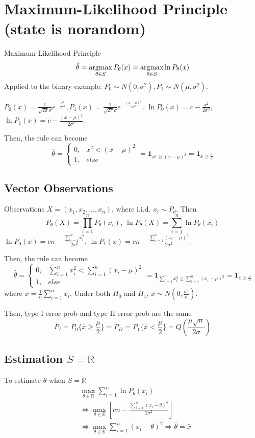 \documentclass[11pt]{elegantbook}
\newcommand{\argmax}{\operatornamewithlimits{argmax}}
\begin{document}
\section{Maximum-Likelihood Principle (state is norandom)}
Maximum-Likelihood Principle $$\hat{\theta}=\argmax_{\theta\in S}P_{\theta}(x)=\argmax_{\theta\in S}\ln P_{\theta}(x)$$
Applied to the binary example: $P_0\sim N(0,\sigma^2), P_1\sim N(\mu,\sigma^2)$.

$P_0(x)=\frac{1}{\sqrt{2\pi}\sigma}e^{-\frac{x^2}{2\sigma^2}}, P_1(x)=\frac{1}{\sqrt{2\pi}\sigma}e^{-\frac{(x-\mu)^2}{2\sigma^2}}$. $\ln P_0(x)=c-\frac{x^2}{2\sigma^2}$, $\ln P_1(x)=c-\frac{(x-\mu)^2}{2\sigma^2}$.

Then, the rule can become $$\hat{\theta}=\left\{\begin{matrix}
    0,&x^2<(x-\mu)^2\\
    1,&else
\end{matrix}\right.=\mathbf{1}_{x^2\geq (x-\mu)^2}=\mathbf{1}_{x\geq \frac{\mu}{2}}$$

\subsection*{Vector Observations}
Observations $X=\left(x_1,x_2,...,x_n\right)$, where i.i.d. $x_i\sim P_\theta$. Then $$P_\theta(X)=\prod_{i=1}^n P_\theta(x_i),\ \ln P_\theta(X)=\sum_{i=1}^n\ln P_\theta(x_i)$$
$\ln P_0(x)=cn-\frac{\sum_{i=1}^n x_i^2}{2\sigma^2}$, $\ln P_1(x)=cn-\frac{\sum_{i=1}^n(x_i-\mu)^2}{2\sigma^2}$.

Then, the rule can become $$\hat{\theta}=\left\{\begin{matrix}
    0,&\sum_{i=1}^nx_i^2<\sum_{i=1}^n(x_i-\mu)^2\\
    1,&else
\end{matrix}\right.=\mathbf{1}_{\sum_{i=1}^nx_i^2\geq \sum_{i=1}^n(x_i-\mu)^2}=\mathbf{1}_{\bar{x}\geq \frac{\mu}{2}}$$
where $\bar{x}=\frac{1}{n}\sum_{i=1}^nx_i$. Under both $H_0$ and $H_1$, $\bar{x}\sim N(0,\frac{\sigma^2}{n})$.

Then, type I error prob and type II error prob are the same $$P_I=P_0\{\bar{x}\geq \frac{\mu}{2}\}=P_{II}=P_1\{\bar{x}< \frac{\mu}{2}\}=Q\left(\frac{\mu\sqrt{n}}{2\sigma}\right)$$

\subsection*{Estimation $S=\mathbb{R}$}
To estimate $\theta$ when $S=\mathbb{R}$
\begin{equation}
    \begin{aligned}
        &\max_{\theta\in \mathbb{R}}\sum_{i=1}^n\ln P_\theta(x_i)\\
        &\Leftrightarrow \max_{\theta\in \mathbb{R}} \left[cn-\frac{\sum_{i=1}^n(x_i-\theta)^2}{2\sigma^2}\right]\\
        &\Leftrightarrow \max_{\theta\in \mathbb{R}} \sum_{i=1}^n(x_i-\theta)^2 \Rightarrow \hat{\theta}=\bar{x}
    \end{aligned}
    \nonumber
\end{equation}
\end{document}
